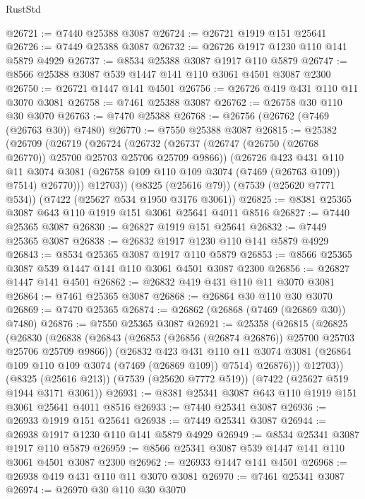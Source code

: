 \begin{lexlean}{RustStd}
\begin{coremodule}
@26721 := @7440 @25388 @3087
@26724 := @26721 @1919 @151 @25641
@26726 := @7449 @25388 @3087
@26732 := @26726 @1917 @1230 @110 @141 @5879 @4929
@26737 := @8534 @25388 @3087 @1917 @110 @5879
@26747 := @8566 @25388 @3087 @539 @1447 @141 @110 @3061 @4501 @3087 @2300
@26750 := @26721 @1447 @141 @4501
@26756 := @26726 @419 @431 @110 @11 @3070 @3081
@26758 := @7461 @25388 @3087
@26762 := @26758 @30 @110 @30 @3070
@26763 := @7470 @25388
@26768 := @26756 (@26762 (@7469 (@26763 @30)) @7480)
@26770 := @7550 @25388 @3087
@26815 := @25382
    (@26709
      (@26719
        (@26724
          (@26732
            (@26737 (@26747 (@26750 (@26768 @26770)) @25700 @25703 @25706 @25709 @9866))
            (@26726
              @423
              @431
              @110
              @11
              @3074
              @3081
              (@26758 @109 @110 @109 @3074 (@7469 (@26763 @109)) @7514)
              @26770)))
        @12703))
    (@8325 (@25616 @79))
    (@7539 (@25620 @7771 @534))
    (@7422 (@25627 @534 @1950 @3176 @3061))
@26825 := @8381 @25365 @3087 @643 @110 @1919 @151 @3061 @25641 @4011 @8516
@26827 := @7440 @25365 @3087
@26830 := @26827 @1919 @151 @25641
@26832 := @7449 @25365 @3087
@26838 := @26832 @1917 @1230 @110 @141 @5879 @4929
@26843 := @8534 @25365 @3087 @1917 @110 @5879
@26853 := @8566 @25365 @3087 @539 @1447 @141 @110 @3061 @4501 @3087 @2300
@26856 := @26827 @1447 @141 @4501
@26862 := @26832 @419 @431 @110 @11 @3070 @3081
@26864 := @7461 @25365 @3087
@26868 := @26864 @30 @110 @30 @3070
@26869 := @7470 @25365
@26874 := @26862 (@26868 (@7469 (@26869 @30)) @7480)
@26876 := @7550 @25365 @3087
@26921 := @25358
    (@26815
      (@26825
        (@26830
          (@26838
            (@26843 (@26853 (@26856 (@26874 @26876)) @25700 @25703 @25706 @25709 @9866))
            (@26832
              @423
              @431
              @110
              @11
              @3074
              @3081
              (@26864 @109 @110 @109 @3074 (@7469 (@26869 @109)) @7514)
              @26876)))
        @12703))
    (@8325 (@25616 @213))
    (@7539 (@25620 @7772 @519))
    (@7422 (@25627 @519 @1944 @3171 @3061))
@26931 := @8381 @25341 @3087 @643 @110 @1919 @151 @3061 @25641 @4011 @8516
@26933 := @7440 @25341 @3087
@26936 := @26933 @1919 @151 @25641
@26938 := @7449 @25341 @3087
@26944 := @26938 @1917 @1230 @110 @141 @5879 @4929
@26949 := @8534 @25341 @3087 @1917 @110 @5879
@26959 := @8566 @25341 @3087 @539 @1447 @141 @110 @3061 @4501 @3087 @2300
@26962 := @26933 @1447 @141 @4501
@26968 := @26938 @419 @431 @110 @11 @3070 @3081
@26970 := @7461 @25341 @3087
@26974 := @26970 @30 @110 @30 @3070

\end{coremodule}
\end{lexlean}
